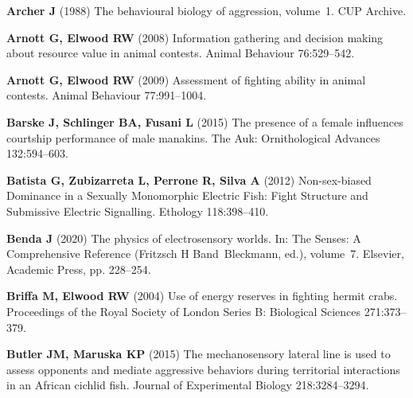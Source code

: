 \documentclass[vruler,JEB]{COB}%
\begin{document}



%

\begin{thebibliography}{70}
\providecommand{\natexlab}[1]{#1}

\textbf{Archer J} (1988) The behavioural biology of aggression, volume~1.
 CUP Archive.

\textbf{Arnott G, Elwood RW} (2008) Information gathering and decision making about
  resource value in animal contests.
 Animal Behaviour 76:529--542.

\textbf{Arnott G, Elwood RW} (2009) Assessment of fighting ability in animal contests.
 Animal Behaviour 77:991--1004.

\textbf{Barske J, Schlinger BA, Fusani L} (2015) The presence of a female influences
  courtship performance of male manakins.
 The Auk: Ornithological Advances 132:594--603.

\textbf{Batista G, Zubizarreta L, Perrone R, Silva A} (2012) Non-sex-biased Dominance in
  a Sexually Monomorphic Electric Fish: Fight Structure and Submissive Electric
  Signalling.
 Ethology 118:398--410.

\textbf{Benda J} (2020) The physics of electrosensory worlds.
 In: The Senses: A Comprehensive Reference (Fritzsch H Band~Bleckmann,
  ed.), volume~7. Elsevier, Academic Press, pp. 228--254.

\textbf{Briffa M, Elwood RW} (2004) Use of energy reserves in fighting hermit crabs.
 Proceedings of the Royal Society of London Series B: Biological
  Sciences 271:373--379.

\textbf{Butler JM, Maruska KP} (2015) The mechanosensory lateral line is used to assess
  opponents and mediate aggressive behaviors during territorial interactions in
  an African cichlid fish.
 Journal of Experimental Biology 218:3284--3294.


\end{thebibliography}
\end{document}

